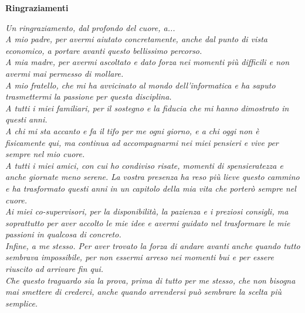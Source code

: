 \thispagestyle{empty}

\hypertarget{ringraziamenti}{}

\begin{center}
  {\bf \Huge Ringraziamenti}
\end{center}

\vspace{4cm}

\noindent
	\emph{Un ringraziamento, dal profondo del cuore, a...\\[0.8em]
		A mio padre, per avermi aiutato concretamente, anche dal punto di vista economico, a portare avanti questo bellissimo percorso.\\[0.8em]
		A mia madre, per avermi ascoltato e dato forza nei momenti più difficili e non avermi mai permesso di mollare.\\[0.8em]
		A mio fratello, che mi ha avvicinato al mondo dell'informatica e ha saputo trasmettermi la passione per questa disciplina.\\[0.8em]
		A tutti i miei familiari, per il sostegno e la fiducia che mi hanno dimostrato in questi anni.\\ A chi mi sta accanto e fa il tifo per me ogni giorno, e a chi oggi non è fisicamente qui, ma continua ad accompagnarmi nei miei pensieri e vive per sempre nel mio cuore.\\[0.8em]
		A tutti i miei amici, con cui ho condiviso risate, momenti di spensieratezza e anche giornate meno serene. La vostra presenza ha reso più lieve questo cammino e ha trasformato questi anni in un capitolo della mia vita che porterò sempre nel cuore.\\[0.8em]
		Ai miei co-supervisori, per la disponibilità, la pazienza e i preziosi consigli, ma soprattutto per aver accolto le mie idee e avermi guidato nel trasformare le mie passioni in qualcosa di concreto.\\[0.8em]
		Infine, a me stesso. Per aver trovato la forza di andare avanti anche quando tutto sembrava impossibile, per non essermi arreso nei momenti bui e per essere riuscito ad arrivare fin qui.\\ Che questo traguardo sia la prova, prima di tutto per me stesso, che non bisogna mai smettere di crederci, anche quando arrendersi può sembrare la scelta più semplice.
}

